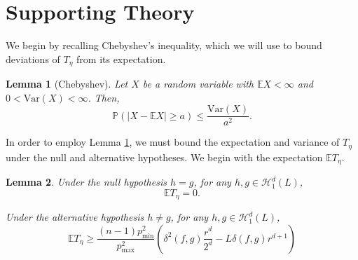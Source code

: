 \documentclass{article}
\newcommand{\abs}[1]{\left \lvert #1 \right \rvert}
\newcommand{\Var}{\mathrm{Var}}
\newcommand{\1}{\mathbb{I}}
\newcommand{\Pbb}{\mathbb{P}}
\newcommand{\Ebb}{\mathbb{E}}
\theoremstyle{alden}
\theoremstyle{aldenthm}
\newtheorem{lemma}{Lemma}
\theoremstyle{definition}
\theoremstyle{remark}
\begin{document}
\section{Supporting Theory}

We begin by recalling Chebyshev's inequality, which we will use to bound deviations of $T_{\eta}$ from its expectation.
\begin{lemma}[Chebyshev]
	\label{lem: chebyshev}
	Let $X$ be a random variable with $\Ebb X < \infty$ and $0 < \Var(X) < \infty$. Then,
	\begin{equation*}
	\Pbb(\abs{X - \Ebb X} \geq a) \leq \frac{\Var(X)}{a^2}.
	\end{equation*}
\end{lemma}

In order to employ Lemma \ref{lem: chebyshev}, we must bound the expectation and variance of $T_{\eta}$ under the null and alternative hypotheses. We begin with the expectation $\Ebb T_{\eta}$. 
\begin{lemma}
	\label{lem: mmd_expectation}
	Under the null hypothesis $h = g$, for any $h, g \in \mathcal{H}_{1}^{d}(L)$,
	\begin{equation*}
	\Ebb T_{\eta} = 0.
	\end{equation*}
	
	Under the alternative hypothesis $h \neq g$, for any $h, g \in \mathcal{H}_{1}^{d}(L)$, 
	\begin{equation*}
	\Ebb T_{\eta} \geq \frac{(n - 1)p_{\min}^2}{ p_{\max}^2} \left(\delta^2(f,g)\frac{r^d}{2^d} - L\delta(f,g)r^{d + 1}\right)
	\end{equation*}
\end{lemma}
\end{document}
